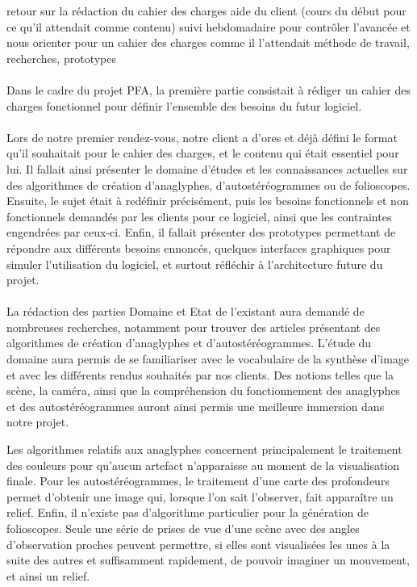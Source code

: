 retour sur la rédaction du cahier des charges
aide du client (cours du début pour ce qu'il attendait comme contenu)
suivi hebdomadaire pour contrôler l'avancée et nous orienter pour un cahier des charges comme il l'attendait
méthode de travail, recherches, prototypes

\paragraph{}
        Dans le cadre du projet PFA, la première partie consistait à rédiger un cahier des charges fonctionnel pour définir l'ensemble des besoins du futur logiciel.

	\paragraph{} 
        Lors de notre premier rendez-vous, notre client a d'ores et déjà défini le format qu'il souhaitait pour le cahier des charges, et le contenu qui était essentiel pour lui. Il fallait ainsi présenter le domaine d'études et les connaissances actuelles sur des algorithmes de création d'anaglyphes, d'autostéréogrammes ou de folioscopes. Ensuite, le sujet était à redéfinir précisément, puis les besoins fonctionnels et non fonctionnels demandés par les clients pour ce logiciel, ainsi que les contraintes engendrées par ceux-ci. Enfin, il fallait présenter des prototypes permettant de répondre aux différents besoins ennoncés, quelques interfaces graphiques pour simuler l'utilisation du logiciel, et surtout réfléchir à l'architecture future du projet.

\paragraph{}
        La rédaction des parties Domaine et Etat de l'existant aura demandé de nombreuses recherches, notamment pour trouver des articles présentant des algorithmes de création d'anaglyphes et d'autostéréogrammes. 
	L'étude du domaine aura permis de se familiariser avec le vocabulaire de la synthèse d'image et avec les différents rendus souhaités par nos clients. Des notions telles que la scène, la caméra, ainsi que la compréhension du fonctionnement des anaglyphes et des autostéréogrammes auront ainsi permis une meilleure immersion dans notre projet.

	Les algorithmes relatifs aux anaglyphes concernent principalement le traitement des couleurs pour qu'aucun artefact n'apparaisse au moment de la visualisation finale. Pour les autostéréogrammes, le traitement d'une carte des profondeurs permet d'obtenir une image qui, lorsque l'on sait l'observer, fait apparaître un relief. Enfin, il n'existe pas d'algorithme particulier pour la génération de folioscopes. Seule une série de prises de vue d'une scène avec des angles d'observation proches peuvent permettre, si elles sont visualisées les unes à la suite des autres et suffisamment rapidement, de pouvoir imaginer un mouvement, et ainsi un relief.

